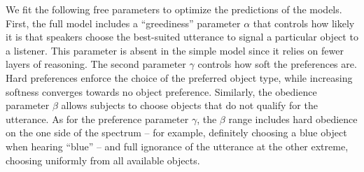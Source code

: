 \documentclass[11pt,a4paper]{article}
\begin{document}
We fit the following free parameters to optimize the predictions of the models. First, the full model includes a ``greediness'' parameter $\alpha$ that controls how likely it is that speakers choose the best-suited utterance to signal a particular object to a listener. This parameter is absent in the simple model since it relies on fewer layers of reasoning. The second parameter $\gamma$ controls how soft the preferences are. 
Hard preferences enforce the choice of the preferred object type, while increasing softness converges towards no object preference. 
Similarly, the obedience parameter $\beta$ allows subjects to choose objects that do not qualify for the utterance. 
As for the preference parameter $\gamma$, the $\beta$ range includes hard obedience on the one side of the spectrum -- for example, definitely choosing a blue object when hearing ``blue'' -- and full ignorance of the utterance at the other extreme, choosing uniformly from all available objects. 
\end{document}
